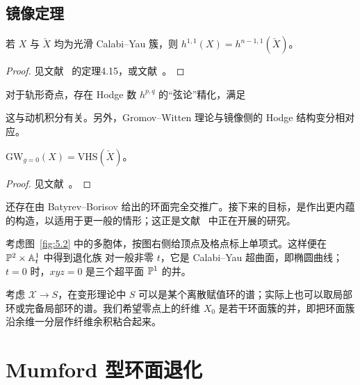 \subsection{镜像定理}
\begin{theorem}\label{thm:5.3}
若 $X$ 与 $\check X$ 均为光滑 Calabi–Yau 簇，则 $h^{1,1}(X)=h^{n-1,1}(\check X)$。
\end{theorem}
\begin{proof}见文献~\cite{ref6} 的定理4.15，或文献~\cite{ref2}。\end{proof}
\begin{theorem}[Batyrev]\label{thm:5.4}
对于轨形奇点，存在 Hodge 数 $h^{p,q}$ 的“弦论”精化，满足
\end{theorem}
这与动机积分有关。另外，Gromov–Witten 理论与镜像侧的 Hodge 结构变分相对应。
\begin{theorem}\label{thm:5.5}
$\mathrm{GW}_{g=0}(X)=\mathrm{VHS}(\check X)$。
\end{theorem}
\begin{proof}见文献~\cite{ref5,ref12,ref22}。\end{proof}
还存在由 Batyrev–Borisov 给出的环面完全交推广。接下来的目标，是作出更内蕴的构造，以适用于更一般的情形；这正是文献~\cite{ref15,ref17} 中正在开展的研究。
\begin{example}\label{ex:5.3}
考虑图~\ref{fig:5.2} 中的多胞体，按图右侧给顶点及格点标上单项式。这样便在 $\mathbb P^2\times\mathbb A_t^1$ 中得到退化族
对一般非零 $t$，它是 Calabi–Yau 超曲面，即椭圆曲线；$t=0$ 时，$xyz=0$ 是三个超平面 $\mathbb P^1$ 的并。
\end{example}
考虑 $\mathcal X\to S$，在变形理论中 $S$ 可以是某个离散赋值环的谱；实际上也可以取局部环或完备局部环的谱。我们希望零点上的纤维 $X_0$ 是若干环面簇的并，即把环面簇沿余维一分层作纤维余积粘合起来。
\section{Mumford 型环面退化}
